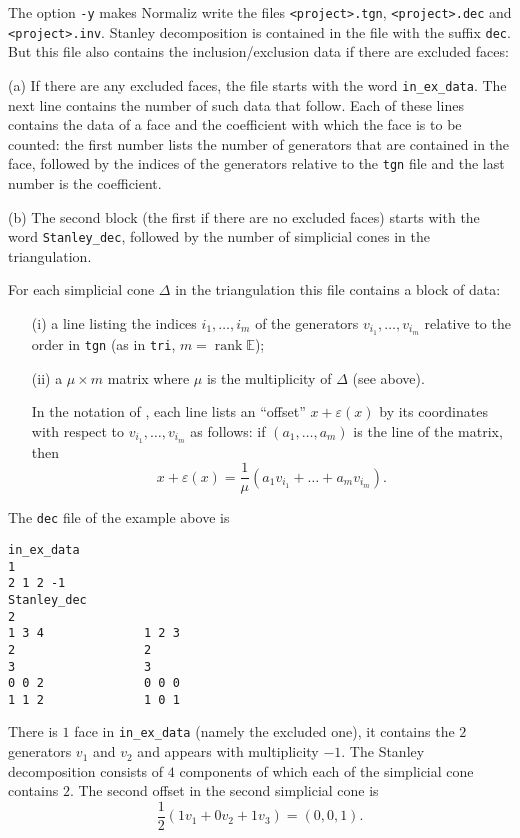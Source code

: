 \documentclass[12pt,a4paper]{scrartcl}
\newcounter{listi}
\theoremstyle{definition}
\def\EE{{\mathbb E}}
\DeclareMathOperator{\rank}{rank}
\let\epsilon=\varepsilon
\def\ttt{\texttt}
\begin{document}
{The option \ttt{-y} makes Normaliz 
write the files  \ttt{<project>.tgn}, \verb|<project>.dec| and \verb|<project>.inv|.   Stanley decomposition is contained in the file with the suffix \verb|dec|. But this file also contains the inclusion/exclusion data if there are excluded faces:

(a) If there are any excluded faces, the file starts with the word
\verb|in_ex_data|. The next line contains the number of such data that follow.
Each of these lines contains the data of a face and the coefficient with which
the face is to be counted: the first number lists the number of generators that
are contained in the face, followed by the indices of the generators relative
to the \verb|tgn| file and the last number is the coefficient.

(b) The second block (the first if there are no excluded faces) starts with
the word \verb|Stanley_dec|, followed by the number of simplicial cones in the
triangulation.

For each simplicial cone $\Delta$ in the
triangulation this file contains a block of data:
\begin{enumerate}
	\item[(i)] a line listing the indices $i_1,\dots,i_m$ of the
	generators $v_{i_1},\dots,v_{i_m}$ relative to the
	order in \ttt{tgn} (as in \ttt{tri}, $m=\rank \EE$);
	
	\item[(ii)] a $\mu\times m$ matrix where $\mu$ is the
	multiplicity of $\Delta$ (see above).
	
	In the notation of \cite{BIS}, each line lists an
	``offset'' $x+\epsilon(x)$  by its coordinates with
	respect to $v_{i_1},\dots,v_{i_m}$ as follows: if
	$(a_1,\dots,a_m)$ is the line of the matrix, then
	$$
	x+\epsilon(x)=\frac{1}{\mu}(a_1v_{i_1}+\dots+a_mv_{i_m}).
	$$
\end{enumerate}


The \verb|dec| file of the example above is
\begin{Verbatim}
in_ex_data
1
2 1 2 -1
Stanley_dec
2
1 3 4              1 2 3 
2                  2     
3                  3     
0 0 2              0 0 0 
1 1 2              1 0 1
\end{Verbatim}

There is $1$ face in \verb|in_ex_data| (namely the excluded one), it contains the $2$ generators $v_1$ and $v_2$  and appears with multiplicity $-1$. The Stanley decomposition consists of $4$ components of which each of the simplicial cone contains $2$. The second offset in the second simplicial cone is
$$
\frac12 (1v_1+0v_2+1v_3)=(0,0,1).
$$ 

}
\end{document}
